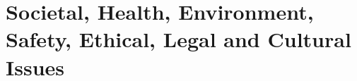 \chapter{Societal, Health, Environment, Safety, Ethical, Legal and Cultural Issues}
\label{chap:outro}






